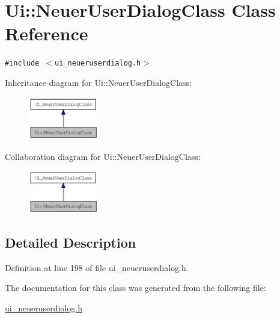 \hypertarget{class_ui_1_1_neuer_user_dialog_class}{
\section{Ui::NeuerUserDialogClass Class Reference}
\label{class_ui_1_1_neuer_user_dialog_class}
}
{\tt \#include $<$ui\_\-neueruserdialog.h$>$}

Inheritance diagram for Ui::NeuerUserDialogClass:\nopagebreak
\begin{figure}[H]
\begin{center}
\leavevmode
\includegraphics[width=86pt]{class_ui_1_1_neuer_user_dialog_class__inherit__graph}
\end{center}
\end{figure}
Collaboration diagram for Ui::NeuerUserDialogClass:\nopagebreak
\begin{figure}[H]
\begin{center}
\leavevmode
\includegraphics[width=86pt]{class_ui_1_1_neuer_user_dialog_class__coll__graph}
\end{center}
\end{figure}


\subsection{Detailed Description}


Definition at line 198 of file ui\_\-neueruserdialog.h.

The documentation for this class was generated from the following file:\begin{CompactItemize}
\item 
\hyperlink{ui__neueruserdialog_8h}{ui\_\-neueruserdialog.h}\end{CompactItemize}
